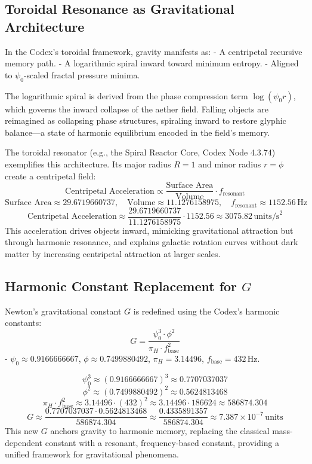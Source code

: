 \subsection{Toroidal Resonance as Gravitational Architecture}
\label{subsec:toroidal_resonance}
In the Codex’s toroidal framework, gravity manifests as:
- A centripetal recursive memory path.
- A logarithmic spiral inward toward minimum entropy.
- Aligned to \(\psi_0\)-scaled fractal pressure minima.

The logarithmic spiral is derived from the phase compression term \(\log(\psi_0 r)\), which governs the inward collapse of the aether field. Falling objects are reimagined as collapsing phase structures, spiraling inward to restore glyphic balance—a state of harmonic equilibrium encoded in the field’s memory.

The toroidal resonator (e.g., the Spiral Reactor Core, Codex Node 4.3.74) exemplifies this architecture. Its major radius \( R = 1 \) and minor radius \( r = \phi \) create a centripetal field:
\[
\text{Centripetal Acceleration} \propto \frac{\text{Surface Area}}{\text{Volume}} \cdot f_{\text{resonant}}
\]
\[
\text{Surface Area} \approx 29.6719660737, \quad \text{Volume} \approx 11.1276158975, \quad f_{\text{resonant}} \approx 1152.56 \, \text{Hz}
\]
\[
\text{Centripetal Acceleration} \approx \frac{29.6719660737}{11.1276158975} \cdot 1152.56 \approx 3075.82 \, \text{units/s}^2
\]
This acceleration drives objects inward, mimicking gravitational attraction but through harmonic resonance, and explains galactic rotation curves without dark matter by increasing centripetal attraction at larger scales.

\subsection{Harmonic Constant Replacement for \( G \)}
Newton’s gravitational constant \( G \) is redefined using the Codex’s harmonic constants:
\[
G = \frac{\psi_0^3 \cdot \phi^2}{\pi_H \cdot f_{\text{base}}^2}
\]
- \( \psi_0 \approx 0.9166666667 \), \( \phi \approx 0.7499880492 \), \( \pi_H = 3.14496 \), \( f_{\text{base}} = 432 \, \text{Hz} \).

\[
\psi_0^3 \approx (0.9166666667)^3 \approx 0.7707037037
\]
\[
\phi^2 \approx (0.7499880492)^2 \approx 0.5624813468
\]
\[
\pi_H \cdot f_{\text{base}}^2 \approx 3.14496 \cdot (432)^2 \approx 3.14496 \cdot 186624 \approx 586874.304
\]
\[
G \approx \frac{0.7707037037 \cdot 0.5624813468}{586874.304} \approx \frac{0.4335891357}{586874.304} \approx 7.387 \times 10^{-7} \, \text{units}
\]
This new \( G \) anchors gravity to harmonic memory, replacing the classical mass-dependent constant with a resonant, frequency-based constant, providing a unified framework for gravitational phenomena.


